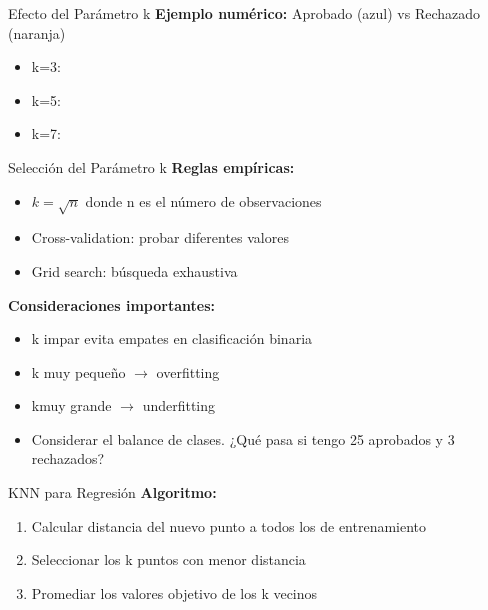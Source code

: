\documentclass{beamer}
\begin{document}
\begin{frame}{Efecto del Parámetro k}
    \textbf{Ejemplo numérico:} Aprobado (azul) vs Rechazado (naranja)
    \begin{itemize}
        \item k=3: 
        \item k=5: 
        \item k=7: 
    \end{itemize}
\end{frame}

\begin{frame}{Selección del Parámetro k}
    \textbf{Reglas empíricas:}
    \begin{itemize}
        \item $k = \sqrt{n}$ donde n es el número de observaciones
        \item Cross-validation: probar diferentes valores
        \item Grid search: búsqueda exhaustiva
    \end{itemize}
    
    \textbf{Consideraciones importantes:}
    \begin{itemize}
        \item k impar evita empates en clasificación binaria
        \item k muy pequeño $\rightarrow$ overfitting
        \item kmuy grande $\rightarrow$ underfitting
        \item Considerar el balance de clases. ¿Qué pasa si tengo 25 aprobados y 3 rechazados?
    \end{itemize}
\end{frame}

\begin{frame}{KNN para Regresión}
    \textbf{Algoritmo:}
    \begin{enumerate}
        \item Calcular distancia del nuevo punto a todos los de entrenamiento
        \item Seleccionar los k puntos con menor distancia
        \item Promediar los valores objetivo de los k vecinos
    \end{enumerate}
\end{frame}
\end{document}
